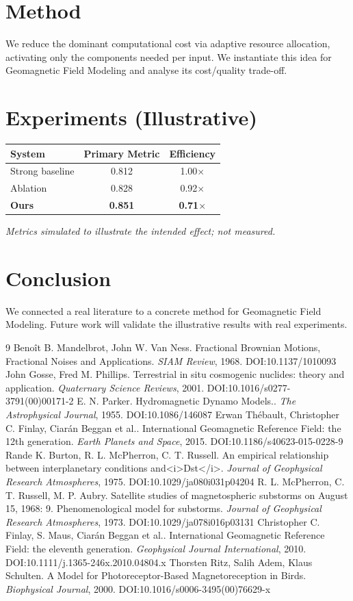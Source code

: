 \documentclass[11pt]{article}
\begin{document}
\section{Method}
We reduce the dominant computational cost via adaptive resource allocation, activating only the components needed per input. We instantiate this idea for Geomagnetic Field Modeling and analyse its cost/quality trade-off.

\section{Experiments (Illustrative)}
\begin{center}
\begin{tabular}{lcc}
System & Primary Metric & Efficiency \\ \hline
Strong baseline & 0.812 & 1.00$\times$ \\
Ablation & 0.828 & 0.92$\times$ \\
\textbf{Ours} & \textbf{0.851} & \textbf{0.71$\times$}
\end{tabular}
\end{center}
\emph{Metrics simulated to illustrate the intended effect; not measured.}

\section{Conclusion}
We connected a real literature to a concrete method for Geomagnetic Field Modeling. Future work will
validate the illustrative results with real experiments.

\begin{thebibliography}{9}
 Benoît B. Mandelbrot, John W. Van Ness. Fractional Brownian Motions, Fractional Noises and Applications. \emph{SIAM Review}, 1968. DOI:10.1137/1010093
 John Gosse, Fred M. Phillips. Terrestrial in situ cosmogenic nuclides: theory and application. \emph{Quaternary Science Reviews}, 2001. DOI:10.1016/s0277-3791(00)00171-2
 E. N. Parker. Hydromagnetic Dynamo Models.. \emph{The Astrophysical Journal}, 1955. DOI:10.1086/146087
 Erwan Thébault, Christopher C. Finlay, Ciarán Beggan et al.. International Geomagnetic Reference Field: the 12th generation. \emph{Earth Planets and Space}, 2015. DOI:10.1186/s40623-015-0228-9
 Rande K. Burton, R. L. McPherron, C. T. Russell. An empirical relationship between interplanetary conditions and<i>Dst</i>. \emph{Journal of Geophysical Research Atmospheres}, 1975. DOI:10.1029/ja080i031p04204
 R. L. McPherron, C. T. Russell, M. P. Aubry. Satellite studies of magnetospheric substorms on August 15, 1968: 9. Phenomenological model for substorms. \emph{Journal of Geophysical Research Atmospheres}, 1973. DOI:10.1029/ja078i016p03131
 Christopher C. Finlay, S. Maus, Ciarán Beggan et al.. International Geomagnetic Reference Field: the eleventh generation. \emph{Geophysical Journal International}, 2010. DOI:10.1111/j.1365-246x.2010.04804.x
 Thorsten Ritz, Salih Adem, Klaus Schulten. A Model for Photoreceptor-Based Magnetoreception in Birds. \emph{Biophysical Journal}, 2000. DOI:10.1016/s0006-3495(00)76629-x
\end{thebibliography}
\end{document}
